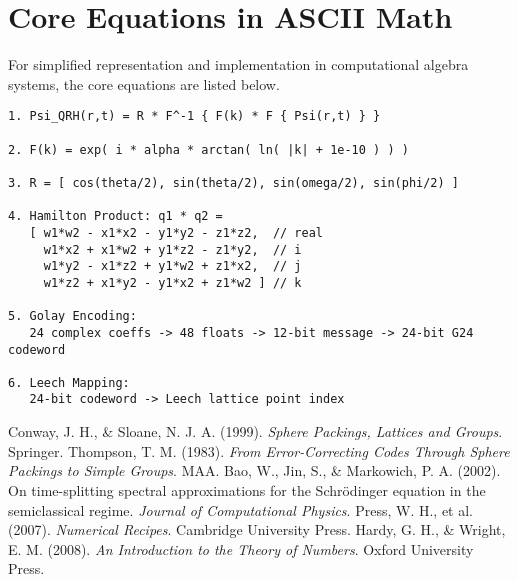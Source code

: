 \documentclass[12pt]{article}
\begin{document}
\appendix
\section{Core Equations in ASCII Math}
For simplified representation and implementation in computational algebra systems, the core equations are listed below.
\begin{verbatim}
1. Psi_QRH(r,t) = R * F^-1 { F(k) * F { Psi(r,t) } }

2. F(k) = exp( i * alpha * arctan( ln( |k| + 1e-10 ) ) )

3. R = [ cos(theta/2), sin(theta/2), sin(omega/2), sin(phi/2) ]

4. Hamilton Product: q1 * q2 = 
   [ w1*w2 - x1*x2 - y1*y2 - z1*z2,  // real
     w1*x2 + x1*w2 + y1*z2 - z1*y2,  // i
     w1*y2 - x1*z2 + y1*w2 + z1*x2,  // j
     w1*z2 + x1*y2 - y1*x2 + z1*w2 ] // k

5. Golay Encoding: 
   24 complex coeffs -> 48 floats -> 12-bit message -> 24-bit G24 codeword

6. Leech Mapping: 
   24-bit codeword -> Leech lattice point index
\end{verbatim}

\begin{thebibliography}{9}
 Conway, J. H., \& Sloane, N. J. A. (1999). \textit{Sphere Packings, Lattices and Groups}. Springer.
 Thompson, T. M. (1983). \textit{From Error-Correcting Codes Through Sphere Packings to Simple Groups}. MAA.
 Bao, W., Jin, S., \& Markowich, P. A. (2002). On time-splitting spectral approximations for the Schrödinger equation in the semiclassical regime. \textit{Journal of Computational Physics}.
 Press, W. H., et al. (2007). \textit{Numerical Recipes}. Cambridge University Press.
 Hardy, G. H., \& Wright, E. M. (2008). \textit{An Introduction to the Theory of Numbers}. Oxford University Press.
\end{thebibliography}
\end{document}

